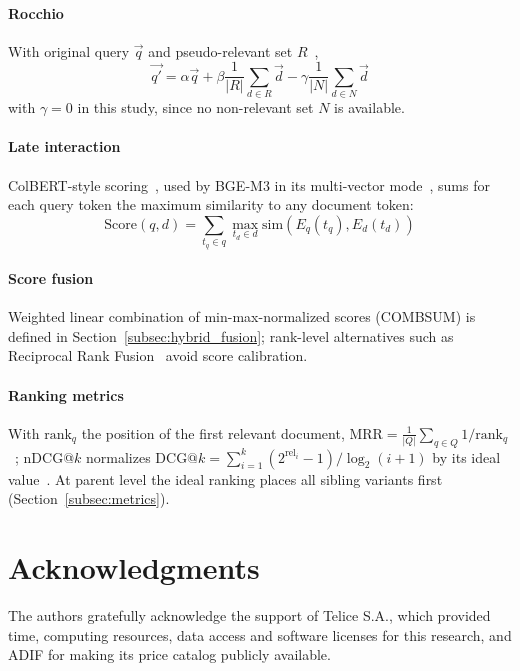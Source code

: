 \documentclass[preprint,review,12pt]{elsarticle}
\begin{document}
\paragraph{Rocchio} With original query $\vec{q}$ and pseudo-relevant set $R$~\cite{rocchio1971relevance},
\begin{equation}
\vec{q'} = \alpha \vec{q} + \beta \frac{1}{|R|} \sum_{d \in R} \vec{d} - \gamma \frac{1}{|N|} \sum_{d \in N} \vec{d}
\end{equation}
with $\gamma = 0$ in this study, since no non-relevant set $N$ is available.

\paragraph{Late interaction} ColBERT-style scoring~\cite{khattab2020colbert}, used by BGE-M3 in its multi-vector mode~\cite{chen2024bge}, sums for each query token the maximum similarity to any document token:
\begin{equation}
\text{Score}(q,d) = \sum_{t_q \in q} \max_{t_d \in d} \text{sim}(E_q(t_q), E_d(t_d))
\end{equation}

\paragraph{Score fusion} Weighted linear combination of min-max-normalized scores (COMBSUM) is defined in Section~\ref{subsec:hybrid_fusion}; rank-level alternatives such as Reciprocal Rank Fusion~\cite{cormack2009reciprocal} avoid score calibration.

\paragraph{Ranking metrics} With $\text{rank}_q$ the position of the first relevant document, $\text{MRR} = \frac{1}{|Q|} \sum_{q \in Q} 1/\text{rank}_q$~\cite{craswell2009mean}; nDCG@$k$ normalizes $\text{DCG@}k = \sum_{i=1}^k (2^{\text{rel}_i} - 1)/\log_2(i+1)$ by its ideal value~\cite{jarvelin2002cumulated}. At parent level the ideal ranking places all sibling variants first (Section~\ref{subsec:metrics}).

\section*{Acknowledgments}

The authors gratefully acknowledge the support of Telice S.A., which provided time, computing resources, data access and software licenses for this research, and ADIF for making its price catalog publicly available.
\end{document}
